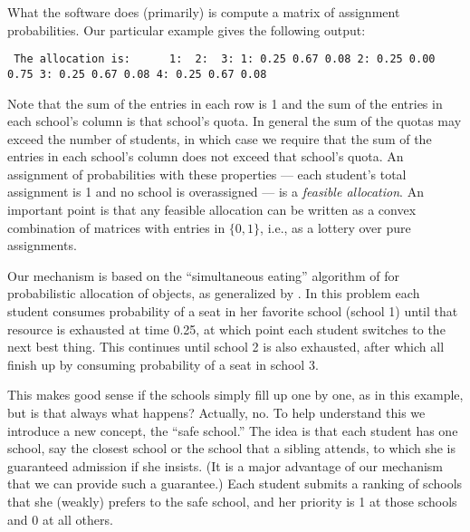 \documentclass[12pt]{article}
\theoremstyle{definition}
\begin{document}
What the software does (primarily) is compute a matrix of assignment
probabilities.  Our particular example gives the following output:
\begin{obeylines}\texttt{
The allocation is:
\ \ \ \ \ 1:    \    2:  \      3:
1:      0.25     0.67     0.08
2:      0.25     0.00     0.75
3:      0.25     0.67     0.08
4:      0.25     0.67     0.08
}
\end{obeylines} \noindent
Note that the sum of the entries in each row is 1 and the sum of the
entries in each school's column is that school's quota.  In general
the sum of the quotas may exceed the number of students, in which case
we require that the sum of the entries in each school's column does
not exceed that school's quota. An assignment of probabilities with
these properties --- each student's total assignment is 1 and no
school is overassigned --- is a \emph{feasible allocation}.  An
important point \citep{bckm13aer} is that any feasible allocation can
be written as a convex combination of matrices with entries in
$\{0,1\}$, i.e., as a lottery over pure assignments.

Our mechanism is based on the ``simultaneous eating'' algorithm of
\cite{bm01} for probabilistic allocation of objects, as generalized by
\cite{balbuzanov22jet}.  In this problem each student consumes
probability of a seat in her favorite school (school 1) until that
resource is exhausted at time 0.25, at which point each student
switches to the next best thing.  This continues until school 2 is
also exhausted, after which all finish up by consuming probability of
a seat in school 3.

This makes good sense if the schools simply fill up one by one, as in
this example, but is that always what happens?  Actually, no.  To help
understand this we introduce a new concept, the ``safe school.''  The
idea is that each student has one school, say the closest school or
the school that a sibling attends, to which she is guaranteed
admission if she insists.  (It is a major advantage of our mechanism
that we can provide such a guarantee.)  Each student submits a ranking
of schools that she (weakly) prefers to the safe school, and her
priority is 1 at those schools and 0 at all others.
\end{document}
